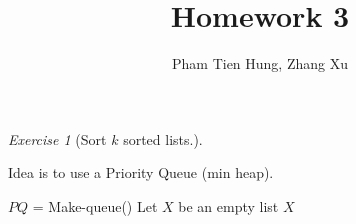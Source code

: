 \documentclass[a4paper,10pt,twoside]{article}
\title{Homework 3}
\author{Pham Tien Hung, Zhang Xu}
\date{}
\theoremstyle{plain}
\theoremstyle{definition}
\theoremstyle{remark}
\newtheorem{exercise}{Exercise}
\begin{document}
\maketitle
\begin{exercise}[Sort $k$ sorted lists.]\

Idea is to use a Priority Queue (min heap).
\begin{algorithm}[h]
	\caption{Sort $k$ sorted lists ($L[1...k][:]$)}
	$PQ$ = Make-queue()\;
	Let $X$ be an empty list\;
	\Return $X$\;
\end{algorithm}
\end{exercise}
\end{document}
